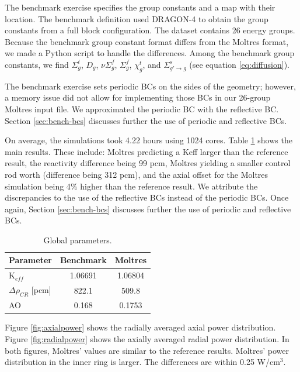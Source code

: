The benchmark exercise specifies the group constants and a map with their location.
The benchmark definition used DRAGON-4 \cite{marleau_user_2016} to obtain the group constants from a full block configuration.
The dataset contains 26 energy groups.
Because the benchmark group constant format differs from the Moltres format, we made a Python script to handle the differences.
Among the benchmark group constants, we find $\Sigma_g^t$, $D_g$, $\nu\Sigma_g^f$, $\Sigma_g^f$, $\chi_g^t$, and $\Sigma_{g'\rightarrow g}^s$ (see equation \ref{eq:diffusion}).

The benchmark exercise sets periodic \glspl{BC} on the sides of the geometry; however, a memory issue did not allow for implementing those BCs in our 26-group Moltres input file.
We approximated the periodic BC with the reflective BC.
Section \ref{sec:bench-bcs} discusses further the use of periodic and reflective BCs.

On average, the simulations took 4.22 hours using 1024 cores.
Table \ref{tab:globalparam} shows the main results.
These include: Moltres predicting a \gls{Keff} larger than the reference result, the reactivity difference being 99 pcm, Moltres yielding a smaller control rod worth (difference being 312 pcm), and the axial offset for the Moltres simulation being 4$\%$ higher than the reference result.
We attribute the discrepancies to the use of the reflective BCs instead of the periodic BCs.
Once again, Section \ref{sec:bench-bcs} discusses further the use of periodic and reflective BCs.

\begin{table}[htbp!]
  \centering
  \caption{Global parameters.}
  \begin{tabular}{l|c|c}
  \toprule
  Parameter 	&  Benchmark  &  Moltres    \\
  \midrule
  K$_{eff}$ 	&  1.06691    &  1.06804    \\
  $\Delta \rho_{CR}$ [pcm]  & 822.1 	& 509.8 \\
  AO        	&  0.168      &  0.1753     \\
  \bottomrule
  \end{tabular}
  \label{tab:globalparam}
\end{table}

Figure \ref{fig:axialpower} shows the radially averaged axial power distribution.
Figure \ref{fig:radialpower} shows the axially averaged radial power distribution.
In both figures, Moltres' values are similar to the reference results.
Moltres' power distribution in the inner ring is larger.
The differences are within 0.25 W/cm$^3$.

